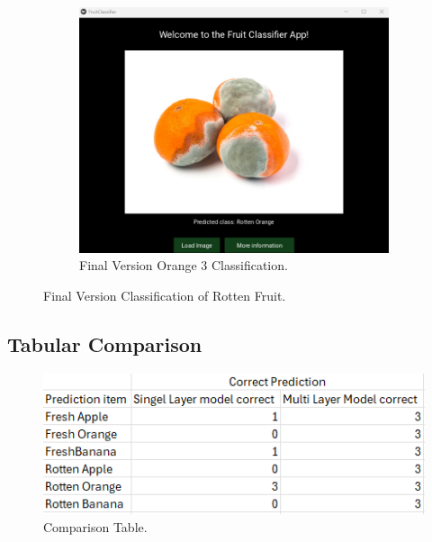 \documentclass[conference]{IEEEtran}
\begin{document}
\begin{figure}[h]
\begin{subfigure}[b]{0.48\linewidth}
        \includegraphics[width=\linewidth]{Mlayer orageR3.png}
        \caption{Final Version Orange 3 Classification.}
        \label{figFB}
    \end{subfigure}
    \caption{Final Version Classification of Rotten Fruit.}
    \label{FigMR}
\end{figure}
\clearpage

\subsection{Tabular Comparison}

\begin{figure}[h]
    \centering
    \includegraphics[width=\linewidth]{Ek wil huil.png}
    \caption{Comparison Table.}
    \label{figHuil}
\end{figure}
\end{document}
